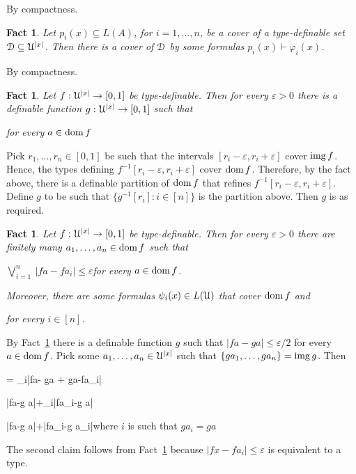 \documentclass[10pt]{article}
\def\proves{\vdash}
\def\proves{\vdash}
\def\dom{\mathop{\rm dom}}
\def\range{\mathop{\rm img}}
\def\imp{\rightarrow}
\def\D{\EuScript D}
\def\U{\EuScript U}
\def\phi{\varphi}
\def\epsilon{\varepsilon}
\newcounter{thm}[section]
\theoremstyle{mio}
\newtheorem{fact}[thm]{Fact}
\theoremstyle{liscio}
\def\QED{\noindent\nolinebreak[4]\hspace{\stretch{1}}\rlap{\ \ $\Box$}\medskip}
\renewenvironment{proof}[1][Proof]%
{\begin{trivlist}\item[\hskip\labelsep {\bf #1}]}
{\QED\end{trivlist}}
\begin{document}
\begin{proof}
  By compactness.
\end{proof}

\begin{fact}\label{fact_cover_type}
  Let $p_i(x)\subseteq L(A)$, for $i=1,\dots,n$, be a cover of a type-definable set $\D\subseteq\U^{|x|}$.
  Then there is a cover of $\D$ by some formulas $p_i(x)\proves\phi_i(x)$.
\end{fact}

\begin{proof}
  By compactness.
\end{proof}

\begin{fact}\label{fact_apx}
  Let $f:\U^{|x|}\to[0,1]$ be type-definable.
  Then for every $\epsilon>0$ there is a definable function  $g:\U^{|x|}\to[0,1]$ such that

  \ceq{\hfill \big|fa-ga\big|}{\le}{\epsilon}\hfill for every $a\in\dom f$
\end{fact}

\begin{proof}
  Pick $r_1,\dots,r_n\in[0,1]$ be such that the intervals $[r_i-\epsilon, r_i+\epsilon]$ cover $\range f$.
  Hence, the types defining $f^{-1}[r_i-\epsilon, r_i+\epsilon]$ cover $\dom f$.
  Therefore, by the fact above, there is a definable partition of $\dom f$ that refines  $f^{-1}[r_i-\epsilon, r_i+\epsilon]$.
  Define $g$ to be such that $\big\{g^{-1}[r_i]: i\in[n]\big\}$ is the partition above. 
  Then $g$ is as required.
\end{proof}

\begin{fact}
  Let $f:\U^{|x|}\to[0,1]$ be type-definable.
  Then for every $\epsilon>0$ there are finitely many $a_1,\dots,a_n\in\dom f$ such that

  \hfill$\displaystyle \bigvee_{i=1}^n\ \big|fa-f a_i\big|\le\epsilon$\hfill for every $a\in\dom f$.

  Moreover, there are some formulas $\psi_i(x)\in L(\U)$ that cover $\dom f$ and
  
  \ceq{\hfill\psi_i(x)}{\imp}{\big|fx-f a_i\big|\le\epsilon}\hfill for every $i\in[n]$.
\end{fact}

\begin{proof}
  By Fact~\ref{fact_apx} there is a definable function $g$ such that $\big|fa-ga\big|\le\epsilon/2$ for  every $a\in\dom f$.
  Pick some $a_1,\dots,a_n\in\U^{|x|}$ such that $\{ga_1,\dots,ga_n\}=\range g$.
  Then

  {=}
  {\min_{i\in[n]}\big|fa- ga + ga-fa_i\big|}
  
  \ceq{\hfill}
  {\le}
  { \big|fa-g a\big|+\min_{i\in[n]}\big|fa_i-g a\big|}

  \ceq{\hfill}
  {\le}
  { \big|fa-g a\big|+\big|fa_i-g a_i\big|}\hfill where $i$ is such that $ga_i=ga$

  \ceq{\hfill}{\le}{\epsilon}

  The second claim follows from Fact~\ref{fact_cover_type} because $|fx-fa_i|\le\epsilon$ is equivalent to a type.
\end{proof}
\end{document}
